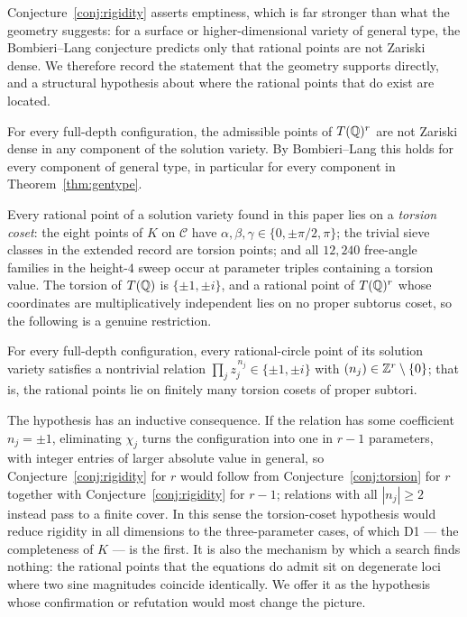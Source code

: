 Conjecture~\ref{conj:rigidity} asserts emptiness, which is far stronger than what the geometry suggests: for a surface or
higher-dimensional variety of general type, the Bombieri--Lang conjecture predicts only that rational points are not
Zariski dense. We therefore record the statement that the geometry supports directly, and a structural hypothesis about
where the rational points that do exist are located.

\begin{conjecture}\label{conj:weak}
For every full-depth configuration, the admissible points of $T(\mathbb Q)^r$ are not Zariski dense in any component of the
solution variety. By Bombieri--Lang this holds for every component of general type, in particular for every component in
Theorem~\ref{thm:gentype}.
\end{conjecture}

Every rational point of a solution variety found in this paper lies on a \emph{torsion coset}: the eight points of $K$
on $\mathcal C$ have $\alpha,\beta,\gamma\in\{0,\pm\pi/2,\pi\}$; the trivial sieve classes in the extended record are
torsion points; and all $12{,}240$ free-angle families in the height-$4$ sweep occur at parameter triples containing a
torsion value. The torsion of $T(\mathbb Q)$ is $\{\pm1,\pm i\}$, and a rational point of $T(\mathbb Q)^r$ whose coordinates are
multiplicatively independent lies on no proper subtorus coset, so the following is a genuine restriction.

\begin{conjecture}\label{conj:torsion}
For every full-depth configuration, every rational-circle point of its solution variety satisfies a nontrivial relation
$\prod_j z_j^{\,n_j}\in\{\pm1,\pm i\}$ with $(n_j)\in\mathbb Z^r\setminus\{0\}$; that is, the rational points lie on
finitely many torsion cosets of proper subtori.
\end{conjecture}

The hypothesis has an inductive consequence. If the relation has some coefficient $n_j=\pm1$, eliminating $\chi_j$
turns the configuration into one in $r-1$ parameters, with integer entries of larger absolute value in general, so
Conjecture~\ref{conj:rigidity} for $r$ would follow from Conjecture~\ref{conj:torsion} for $r$ together with
Conjecture~\ref{conj:rigidity} for $r-1$; relations with all $|n_j|\ge2$ instead pass to a finite cover. In this sense
the torsion-coset hypothesis would reduce rigidity in all dimensions to the three-parameter cases, of which D1 — the
completeness of $K$ — is the first. It is also the mechanism by which a search finds nothing: the rational points that
the equations do admit sit on degenerate loci where two sine magnitudes coincide identically. We offer it as the
hypothesis whose confirmation or refutation would most change the picture.


